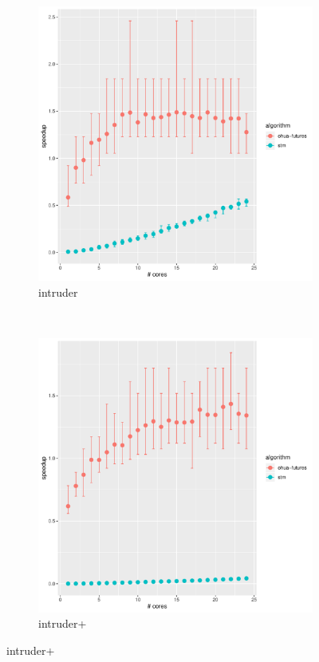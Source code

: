 \begin{figure}
    \centering
    \begin{subfigure}[t]{.32\textwidth}
        \includegraphics[width=\textwidth,keepaspectratio]{gfx/results/intruder/intruder}
        \caption{intruder}%
    \end{subfigure}%
    ~
    \begin{subfigure}[t]{.32\textwidth}
        \includegraphics[width=\textwidth,keepaspectratio]{gfx/results/intruder/intruder+}
        \caption{intruder+}%
    \end{subfigure}%


\end{figure}
